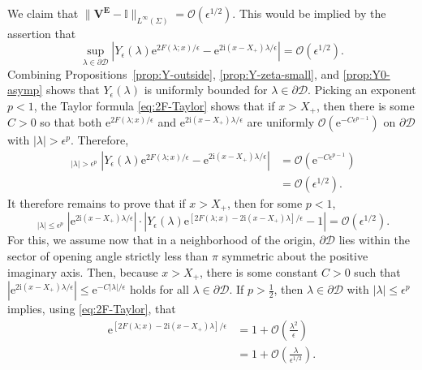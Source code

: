 \documentclass[12pt]{amsart}
\numberwithin{equation}{section}
\newcommand{\ee}{\mathrm{e}}
\newcommand{\ii}{\mathrm{i}}
\newcommand{\SP}{\lambda}
\newcommand{\bigo}[1]{ \mathcal{O}\! \left( #1 \right) }
\begin{document}
We claim that $\|\mathbf{V}^\mathbf{E}-\mathbb{I}\|_{L^\infty(\Sigma)}=\bigo{\epsilon^{1/2}}$.  This would be implied by the assertion that
\begin{equation}
\sup_{\SP\in\partial \mathscr{D}}\left|Y_\epsilon(\SP)\ee^{2F(\SP;x)/\epsilon}-\ee^{2\ii (x- X_+)\SP/\epsilon}\right| = \bigo{\epsilon^{1/2}}.
\label{eq:sup-loop}
\end{equation}
Combining Propositions~\ref{prop:Y-outside}, \ref{prop:Y-zeta-small}, and \ref{prop:Y0-asymp} shows that $Y_\epsilon(\SP)$ is uniformly bounded for $\SP\in\partial \mathscr{D}$.
Picking an exponent $p<1$, the Taylor formula \eqref{eq:2F-Taylor} shows that if $x>X_+$, then there is some $C>0$ so that both $\ee^{2F(\SP;x)/\epsilon}$ and $\ee^{2\ii (x-X_+)\SP/\epsilon}$ are uniformly $\bigo{\ee^{-C\epsilon^{p-1}}}$ on $\partial \mathscr{D}$ with $|\SP|>\epsilon^p$.  Therefore,
\begin{equation}
\begin{split}
\mathop{\sup_{\SP\in\partial \mathscr{D}}}_{|\SP|>\epsilon^p}\left|Y_\epsilon(\SP)\ee^{2F(\SP;x)/\epsilon}-\ee^{2\ii (x-X_+)\SP/\epsilon}\right| &= \bigo{\ee^{-C\epsilon^{p-1}}} \\ &= \bigo{\epsilon^{1/2}}.
\end{split}
\label{eq:outer-estimate}
\end{equation}
It therefore remains to prove that if $x>X_+$, then for some $p<1$,
\begin{equation}
\mathop{\sup_{\SP\in \partial \mathscr{D}}}_{|\SP|\le\epsilon^p}\left|\ee^{2\ii (x-X_+)\SP/\epsilon}\right|\cdot\left|Y_\epsilon(\SP)\ee^{[2F(\SP;x)-2\ii (x-X_+)\SP]/\epsilon}-1\right|=\bigo{\epsilon^{1/2}}.
\label{eq:WTS-1}
\end{equation}
For this, we assume now that in a neighborhood of the origin, $\partial\mathscr{D}$ lies within the  sector of opening angle strictly less than $\pi$ symmetric about the positive imaginary axis.  Then, because $x>X_+$, there is some constant $C>0$ such that $|\ee^{2\ii (x-X_+)\SP/\epsilon}|\le \ee^{-C|\SP|/\epsilon}$ holds for all $\SP\in\partial \mathscr{D}$.  If $p>\tfrac{1}{2}$, then $\SP\in \partial \mathscr{D}$ with $|\SP|\le\epsilon^p$ implies, using \eqref{eq:2F-Taylor}, that 
\begin{equation}
\begin{split}
\ee^{[2F(\SP;x)-2\ii (x-X_+)\SP]/\epsilon}&=1+\bigo{\frac{\SP^2}{\epsilon}}\\
&=1+\bigo{\frac{\SP}{\epsilon^{1/2}}}. 
\end{split}
\label{eq:exponential-expand-1}
\end{equation}
\end{document}
